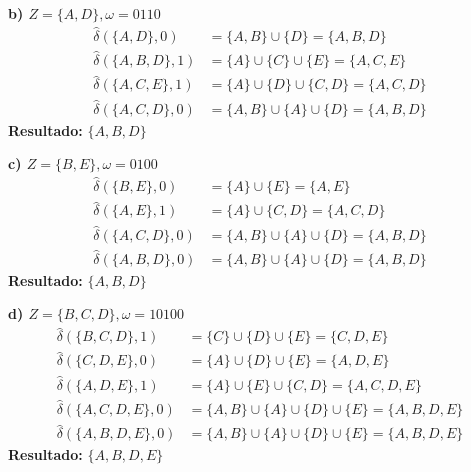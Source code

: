 \documentclass[12pt]{article}
\begin{document}
\begin{center}
\begin{center}
\begin{minipage}{0.45\textwidth}
\vspace{0.2cm}
\textbf{b) $Z = \{A, D\}, \omega = 0110$}
\begin{align*}
    \hat{\delta}(\{A, D\}, 0) &= \{A, B\} \cup \{D\} = \{A, B, D\} \\
    \hat{\delta}(\{A, B, D\}, 1) &= \{A\} \cup \{C\} \cup \{E\} = \{A, C, E\} \\
    \hat{\delta}(\{A, C, E\}, 1) &= \{A\} \cup \{D\} \cup \{C, D\} = \{A, C, D\} \\
    \hat{\delta}(\{A, C, D\}, 0) &= \{A, B\} \cup \{A\} \cup \{D\} = \{A, B, D\}
\end{align*}
\textbf{Resultado:} $\{A, B, D\}$
\end{minipage}
\hfill
\begin{minipage}{0.45\textwidth}

\vspace{0.2cm}
\textbf{c) $Z = \{B, E\}, \omega = 0100$}
\begin{align*}
    \hat{\delta}(\{B, E\}, 0) &= \{A\} \cup \{E\} = \{A, E\} \\
    \hat{\delta}(\{A, E\}, 1) &= \{A\} \cup \{C, D\} = \{A, C, D\} \\
    \hat{\delta}(\{A, C, D\}, 0) &= \{A, B\} \cup \{A\} \cup \{D\} = \{A, B, D\} \\
    \hat{\delta}(\{A, B, D\}, 0) &= \{A, B\} \cup \{A\} \cup \{D\} = \{A, B, D\}
\end{align*}
\textbf{Resultado:} $\{A, B, D\}$

\vspace{0.2cm}
\textbf{d) $Z = \{B, C, D\}, \omega = 10100$}
\begin{align*}
    \hat{\delta}(\{B, C, D\}, 1) &= \{C\} \cup \{D\} \cup \{E\} = \{C, D, E\} \\
    \hat{\delta}(\{C, D, E\}, 0) &= \{A\} \cup \{D\} \cup \{E\} = \{A, D, E\} \\
    \hat{\delta}(\{A, D, E\}, 1) &= \{A\} \cup \{E\} \cup \{C, D\} = \{A, C, D, E\} \\
    \hat{\delta}(\{A, C, D, E\}, 0) &= \{A, B\} \cup \{A\} \cup \{D\} \cup \{E\} = \{A, B, D, E\} \\
    \hat{\delta}(\{A, B, D, E\}, 0) &= \{A, B\} \cup \{A\} \cup \{D\} \cup \{E\} = \{A, B, D, E\}
\end{align*}
\textbf{Resultado:} $\{A, B, D, E\}$
\end{minipage}
\end{center}
\end{center}
\end{document}
